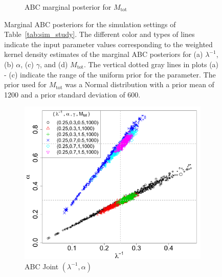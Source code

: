 \documentclass[ejs]{imsart}
\numberwithin{equation}{section}
\theoremstyle{plain}
\newcommand{\Mtot}{M_{\text{tot}}}
\begin{document}
\begin{figure}[htbp]
\begin{subfigure}{0.48\textwidth}
\caption{ABC marginal posterior for  $\Mtot$}\label{subfig:marg_mtot}
\end{subfigure}
%
 \caption{Marginal ABC posteriors for the simulation settings of Table~\ref{tab:sim_study}.  The different color and types of lines indicate the input parameter values corresponding to the weighted kernel density estimates of the marginal ABC posteriors for (a) $\lambda^{-1}$, (b) $\alpha$, (c) $\gamma$, and (d) $\Mtot$.  The vertical dotted gray lines in plots (a) - (c) indicate the range of the uniform prior for the parameter.  The prior used for $\Mtot$ was a Normal distribution with a prior mean of 1200 and a prior standard deviation of 600.
   }
   \label{fig:abc_pa_posterior}
\end{figure}


\begin{figure}[htbp]
   \centering
\begin{subfigure}{0.32\textwidth}
\centering
\includegraphics[width = \textwidth]{figures/joint_k_alpha.pdf} 
\caption{ABC Joint $(\lambda^{-1}, \alpha)$}\label{subfig:joint_alpha_k}
\end{subfigure}
\begin{subfigure}{0.32\textwidth}
\centering

\end{subfigure}
\end{figure}
\end{document}
